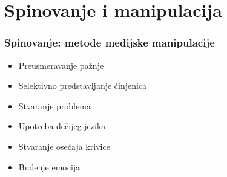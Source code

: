 \documentclass[13pt]{beamer}
\begin{document}
\section{Spinovanje i manipulacija}

\begin{frame}[fragile]\frametitle{Spinovanje: metode medijske manipulacije}
	\begin{itemize}	
		\item Preusmeravanje pažnje
		\item Selektivno predstavljanje činjenica
		\item Stvaranje problema
  	\item Upotreba dečijeg jezika
		\item Stvaranje osećaja krivice
		\item Buđenje emocija
	\end{itemize}
\end{frame}
\end{document}
